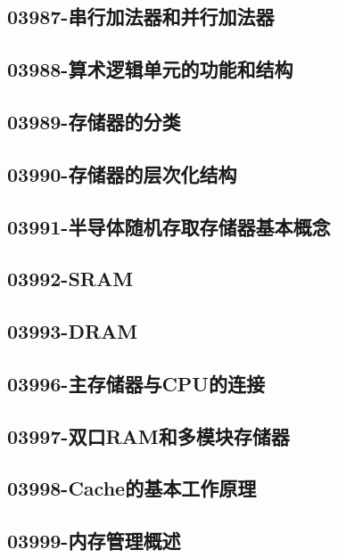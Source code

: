 \subsection{03987-串行加法器和并行加法器}

\subsection{03988-算术逻辑单元的功能和结构}

\subsection{03989-存储器的分类}

\subsection{03990-存储器的层次化结构}

\subsection{03991-半导体随机存取存储器基本概念}

\subsection{03992-SRAM}

\subsection{03993-DRAM}

\subsection{03996-主存储器与CPU的连接}

\subsection{03997-双口RAM和多模块存储器}

\subsection{03998-Cache的基本工作原理}

\subsection{03999-内存管理概述}

